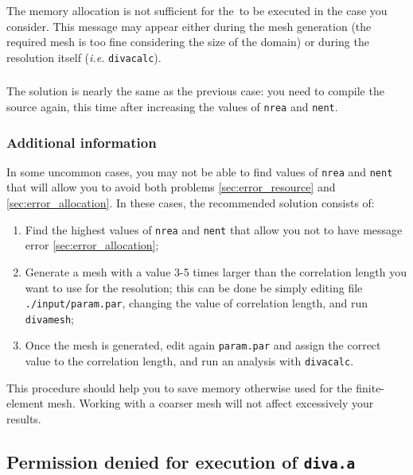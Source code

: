 The memory allocation is not sufficient for the \diva\,to be executed in the case you consider. This message may appear either during the mesh generation (the required mesh is too fine considering the size of the domain) or during the resolution itself (\textit{i.e.} \texttt{divacalc}).

\subsubsection{\answer}

The solution is nearly the same as the previous case: you need to compile the source again, this time after increasing the values of \texttt{nrea} and \texttt{nent}.

\subsubsection[Additional information]{Additional information \expert}

In some uncommon cases, you may not be able to find values of \texttt{nrea} and \texttt{nent} that will allow you to avoid both problems \ref{sec:error_resource} and \ref{sec:error_allocation}. In these cases, the recommended solution consists of:
\begin{enumerate}
\item Find the highest values of \texttt{nrea} and \texttt{nent} that allow you not to have message error \ref{sec:error_allocation};
\item Generate a mesh with a value 3-5 times larger than the correlation length you want to use for the resolution; this can be done be simply editing file \texttt{./input/param.par}, changing the value of correlation length, and run \texttt{divamesh};
\item Once the mesh is generated, edit again \texttt{param.par} and assign the correct value to the correlation length, and run an analysis with \texttt{divacalc}.
\end{enumerate}

This procedure should help you to save memory otherwise used for the finite-element mesh. Working with a coarser mesh will not affect excessively your results.





\subsection{Permission denied for execution of \texttt{diva.a}\label{sec:error_gfortran}}


